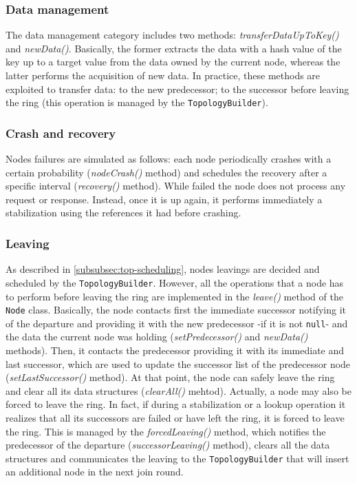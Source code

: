 \documentclass[11pt,twocolumn,letterpaper]{article}
\begin{document}
	\subsubsection{Data management}
	\label{subsubsec:data-management}
	The data management category includes two methods: \textit{transferDataUpToKey()} and \textit{newData()}. \newline
	Basically, the former extracts the data with a hash value of the key up to a target value from the data owned by the current node, whereas the latter performs the acquisition of new data. In practice, these methods are exploited to transfer data: to the new predecessor; to the successor before leaving the ring (this operation is managed by the \texttt{TopologyBuilder}). 
	
	\subsubsection{Crash and recovery}
	\label{subsubsec:crash-n-recovery}
	Nodes failures are simulated as follows: each node periodically crashes with a certain probability (\textit{nodeCrash()} method) and schedules the recovery after a specific interval (\textit{recovery()} method). While failed the node does not process any request or response. Instead, once it is up again, it performs immediately a stabilization using the references it had before crashing.
	
	\subsubsection{Leaving}
	\label{subsubsec:leaving}
	As described in \cref{subsubsec:top-scheduling}, nodes leavings are decided and scheduled by the \texttt{TopologyBuilder}. However, all the operations that a node has to perform before leaving the ring are implemented in the \textit{leave()} method
	of the \texttt{Node} class. \newline
	Basically, the node contacts first the immediate successor notifying it of the departure and providing it with the new predecessor -if it is not \texttt{null}- and the data the current node was holding (\textit{setPredecessor()} and \textit{newData()} methods). Then, it contacts the predecessor providing it with its immediate and last successor, which are used to update the successor list of the predecessor node (\textit{setLastSuccessor()} method). At that point, the node can safely leave the ring and clear all its data structures (\textit{clearAll()} mehtod). \newline
	Actually, a node may also be forced to leave the ring. In fact, if during a stabilization or a lookup operation it realizes that all its successors are failed or have left the ring, it is forced to leave the ring. This is managed by the \textit{forcedLeaving()} method, which notifies the predecessor of the departure (\textit{successorLeaving()} method), clears all the data structures and communicates the leaving to the \texttt{TopologyBuilder} that will insert an additional node in the next join round.
	
\end{document}
